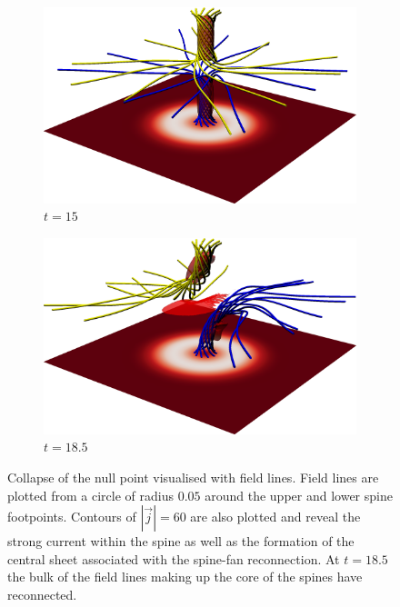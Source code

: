 \begin{figure}[t]
  \centering
    \begin{subfigure}{0.49\textwidth}
      \includegraphics[width=\linewidth]{field_line_plots/cropped/v-4r-4-isotropic_0030_cropped.png}
      \caption{$t=15$}
      \label{fig:v-4r-4-iso-field-30}
    \end{subfigure}
    \hfill
    \begin{subfigure}{0.49\textwidth}
      \includegraphics[width=\linewidth]{field_line_plots/cropped/v-4r-4-isotropic_0037_cropped.png}
      \caption{$t=18.5$}
      \label{fig:v-4r-4-iso-field-37}
    \end{subfigure}
\caption{Collapse of the null point visualised with field lines. Field lines are plotted from a circle of radius $0.05$ around the upper and lower spine footpoints. Contours of $|\vec{j}| = 60$ are also plotted and reveal the strong current within the spine as well as the formation of the central sheet associated with the spine-fan reconnection. At $t=18.5$ the bulk of the field lines making up the core of the spines have reconnected.}
\label{fig:khi_field_lines_collapse}
\end{figure}

